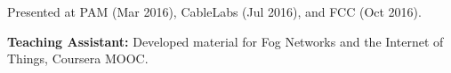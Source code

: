 \begin{cventries}
{\begin{cvitems}
{      		}
      \item {Presented at PAM (Mar 2016), CableLabs (Jul 2016), and FCC (Oct 2016).
      		}
%
      \item {\textbf{Teaching Assistant:} Developed material for Fog Networks and the Internet of Things, Coursera MOOC.
      		}
      \end{cvitems}
    }


\end{cventries}
